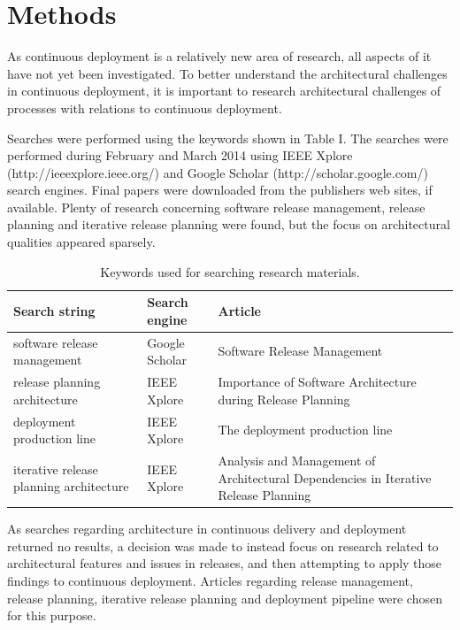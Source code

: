 \documentclass[conference]{IEEEtran}
\begin{document}
\section{Methods} %

As continuous deployment is a relatively new area of research, all aspects of it have not yet been investigated. To better understand the architectural challenges in continuous deployment, it is important to research architectural challenges of processes with relations to continuous deployment.

Searches were performed using the keywords shown in Table I. The searches were performed during February and March 2014 using IEEE Xplore (http://ieeexplore.ieee.org/‎) and Google Scholar (http://scholar.google.com/) search engines. Final papers were downloaded from the publishers web sites, if available. Plenty of research concerning software release management, release planning and iterative release planning were found, but the focus on architectural qualities appeared sparsely.  

\begin{center}
\begin{table}
    \caption{Keywords used for searching research materials.}
    \begin{tabular}{ | p{2cm} | p{2cm} | p{3.5cm} |}
    \hline
    Search string & Search engine & Article \\ \hline
    software release management & Google Scholar & Software Release Management \\ \hline
	release planning architecture & IEEE Xplore & Importance of Software Architecture during Release Planning \\ \hline
	deployment production line & IEEE Xplore & The deployment production line \\ \hline
	iterative release planning architecture & IEEE Xplore & Analysis and Management of Architectural Dependencies in Iterative Release Planning \\ \hline
    \end{tabular}
    \end{table}
\end{center}

As searches regarding architecture in continuous delivery and deployment returned no results, a decision was made to instead focus on research related to architectural features and issues in releases, and then attempting to apply those findings to continuous deployment. Articles regarding release management, release planning, iterative release planning and deployment pipeline were chosen for this purpose.
\end{document}
